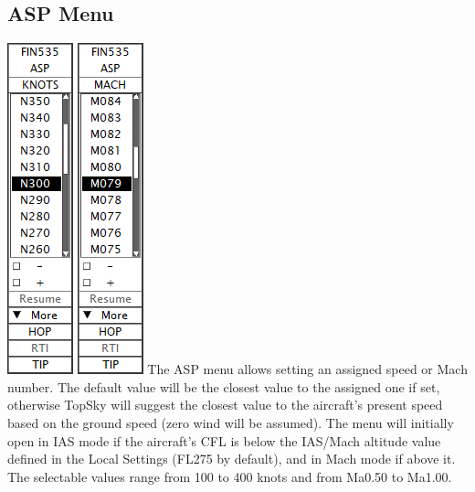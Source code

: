 \documentclass[11pt,a4paper]{memoir}
\begin{document}
\subsection{ASP Menu}
\label{menu:asp}
\includegraphics{img/asp.png}
\includegraphics{img/aspmach.png}
The ASP menu allows setting an assigned speed or Mach number. The default value will be the closest value to the assigned one if set, otherwise TopSky will suggest the closest value to the aircraft’s present speed based on the ground speed (zero wind will be assumed). The menu will initially open in IAS mode if the aircraft’s CFL is below the IAS/Mach altitude value defined in the Local Settings (FL275 by default), and in Mach mode if above it. The selectable values range from 100 to 400 knots and from Ma0.50 to Ma1.00.
\end{document}
